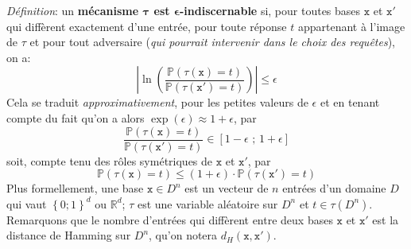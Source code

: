 \documentclass[a4paper,11pt]{article} %
\begin{document}
\emph{Définition}: un \textbf{mécanisme $\mathbf{\tau}$ est $\mathbf{\epsilon}$-indiscernable} si, pour toutes bases $\mathtt{x}$ et $\mathtt{x'}$ qui diffèrent exactement d'une entrée, pour toute réponse $t$ appartenant à l'image de $\tau$ et pour tout adversaire (\emph{qui pourrait intervenir dans le choix des requêtes}), on a:
\[\left|\ln\left(\frac{\mathbb{P}(\tau(\mathtt{x})=t)}{\mathbb{P}(\tau(\mathtt{x'})=t)}\right)\right|\leqslant\epsilon\]
Cela se traduit \emph{approximativement}, pour les petites valeurs de $\epsilon$ et en tenant compte du fait qu'on a alors $\exp(\epsilon)\approx1+\epsilon$, par
\[\frac{\mathbb{P}(\tau(\mathtt{x})=t)}{\mathbb{P}(\tau(\mathtt{x'})=t)} \in \left[1-\epsilon \text{ ; } 1+\epsilon \right]\]
soit, compte tenu des rôles symétriques de $\mathtt{x}$ et $\mathtt{x'}$, par
\[\mathbb{P}\left(\tau(\mathtt{x})=t\right) \leqslant (1+\epsilon)\cdot\mathbb{P}\left(\tau(\mathtt{x'})=t\right)\]
Plus formellement, une base $\mathtt{x}\in D^n$ est un vecteur de $n$ entrées d'un domaine $D$ qui vaut $\left\{0;1\right\}^d$ ou $\mathbb{R}^d$; $\tau$ est une variable aléatoire sur $D^n$ et $t\in\tau(D^n)$. Remarquons que le nombre d'entrées qui diffèrent entre deux bases $\mathtt{x}$ et $\mathtt{x'}$ est la distance de Hamming sur $D^n$, qu'on notera  $d_H(\mathtt{x},\mathtt{x'})$.

\vspace{0.6em}
\end{document}
